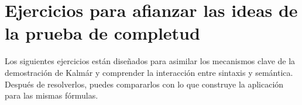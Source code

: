 

\section{Ejercicios para afianzar las ideas de la prueba de completud}

Los siguientes ejercicios están diseñados para asimilar los mecanismos clave de la demostración de Kalmár y comprender la interacción entre sintaxis y semántica. Después de resolverlos, puedes compararlos con lo que construye la aplicación \appkalmar{} para las mismas fórmulas.

